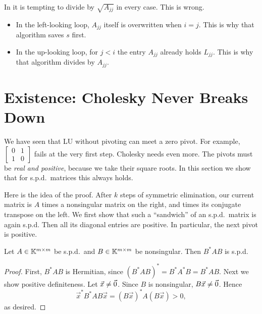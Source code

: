 In  it is tempting to divide by $\sqrt{A_{jj}}$ in every case. This is wrong.
\begin{itemize}
  \item In the left-looking loop, $A_{jj}$ itself is overwritten when $i = j$. This is why that algorithm saves $s$ first.
  \item In the up-looking loop, for $j < i$ the entry $A_{jj}$ already holds $L_{jj}$. This is why that algorithm divides by $A_{jj}$.
\end{itemize}

\clearpage
\section{Existence: Cholesky Never Breaks Down}
\label{sec:chol-exists}

We have seen that LU without pivoting can meet a zero pivot. For example, $\left[\begin{smallmatrix} 0 & 1 \\ 1 & 0 \end{smallmatrix}\right]$ fails at the very first step. Cholesky needs even more. The pivots must be \emph{real and positive}, because we take their square roots. In this section we show that for s.p.d.\ matrices this always holds.

Here is the idea of the proof. After $k$ steps of symmetric elimination, our current matrix is $A$ times a nonsingular matrix on the right, and times its conjugate transpose on the left. We first show that such a ``sandwich'' of an s.p.d.\ matrix is again s.p.d. Then all its diagonal entries are positive. In particular, the next pivot is positive.

\begin{lemma}
  \label{lem:congruence}
  Let $A \in \mathbb{K}^{m \times m}$ be s.p.d.\ and $B \in \mathbb{K}^{m \times m}$ be nonsingular. Then $B^\ast AB$ is s.p.d.
\end{lemma}

\begin{proof}
  First, $B^\ast AB$ is Hermitian, since $(B^\ast AB)^\ast = B^\ast A^\ast B = B^\ast AB$. Next we show positive definiteness. Let $\vec{x} \ne \vec{0}$. Since $B$ is nonsingular, $B\vec{x} \ne \vec{0}$. Hence
  \begin{equation}
    \vec{x}^\ast B^\ast AB\vec{x} = (B\vec{x})^\ast A(B\vec{x}) > 0,
  \end{equation}
  as desired.
\end{proof}

